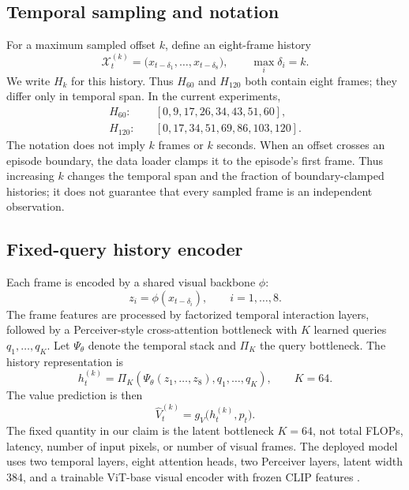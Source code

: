 \documentclass[10pt,a4paper]{article}
\begin{document}
\subsection{Temporal sampling and notation}

For a maximum sampled offset $k$, define an eight-frame history
\begin{equation}
  \mathcal{X}^{(k)}_t = \bigl(x_{t-\delta_1},\ldots,x_{t-\delta_8}\bigr), \qquad \max_i \delta_i=k.
\end{equation}
We write $H_k$ for this history. Thus $H_{60}$ and $H_{120}$ both contain eight frames; they differ only in temporal span. In the current experiments,
\begin{align}
  H_{60}:&\quad [0,9,17,26,34,43,51,60],\\
  H_{120}:&\quad [0,17,34,51,69,86,103,120].
\end{align}
The notation does not imply $k$ frames or $k$ seconds.
When an offset crosses an episode boundary, the data loader clamps it to the episode's first frame. Thus increasing $k$ changes the temporal span and the fraction of boundary-clamped histories; it does not guarantee that every sampled frame is an independent observation.

\subsection{Fixed-query history encoder}

Each frame is encoded by a shared visual backbone $\phi$:
\begin{equation}
  z_i = \phi(x_{t-\delta_i}), \qquad i=1,\ldots,8.
\end{equation}
The frame features are processed by factorized temporal interaction layers, followed by a Perceiver-style cross-attention bottleneck with $K$ learned queries $q_1,\ldots,q_K$. Let $\Psi_\theta$ denote the temporal stack and $\Pi_K$ the query bottleneck. The history representation is
\begin{equation}
  h_t^{(k)} = \Pi_K\!\left(\Psi_\theta(z_1,\ldots,z_8),q_1,\ldots,q_K\right),
  \qquad K=64.
\end{equation}
The value prediction is then
\begin{equation}
  \hat V_t^{(k)} = g_V\bigl(h_t^{(k)},p_t\bigr).
\end{equation}
The fixed quantity in our claim is the latent bottleneck $K=64$, not total FLOPs, latency, number of input pixels, or number of visual frames. The deployed model uses two temporal layers, eight attention heads, two Perceiver layers, latent width 384, and a trainable ViT-base visual encoder with frozen CLIP features \citep{dosovitskiy2021vit,radford2021clip,jaegle2021perceiver}.
\end{document}
